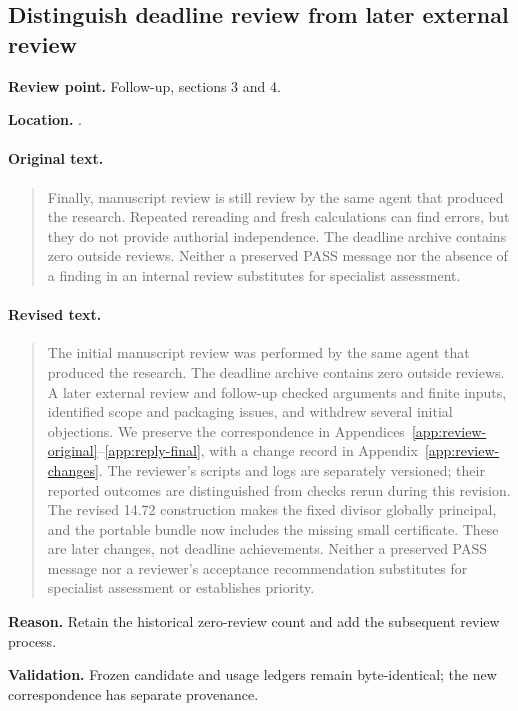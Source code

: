 \subsection{Distinguish deadline review from later external review}
\noindent\textbf{Review point.} Follow-up, sections 3 and 4.\par
\noindent\textbf{Location.} .

\paragraph{Original text.}
\begin{quote}\small
Finally, manuscript review is still review by the same agent that
produced the research. Repeated rereading and fresh calculations can
find errors, but they do not provide authorial independence. The
deadline archive contains zero outside reviews. Neither a preserved
PASS message nor the absence of a finding in an internal review
substitutes for specialist assessment.
\end{quote}

\paragraph{Revised text.}
\begin{quote}\small
The initial manuscript review was performed by the same agent that
produced the research. The deadline archive contains zero outside
reviews. A later external review and follow-up checked arguments and
finite inputs, identified scope and packaging issues, and withdrew
several initial objections. We preserve the correspondence in
Appendices~\ref{app:review-original}--\ref{app:reply-final}, with a
change record in Appendix~\ref{app:review-changes}. The reviewer's
scripts and logs are separately versioned; their reported outcomes
are distinguished from checks rerun during this revision.
The revised 14.72 construction makes the fixed divisor globally
principal, and the portable bundle now includes the missing small
certificate. These are later changes, not deadline achievements.
Neither a preserved PASS message nor a reviewer's acceptance
recommendation substitutes for specialist assessment or establishes
priority.
\end{quote}

\noindent\textbf{Reason.} Retain the historical zero-review count and add the subsequent review process.

\noindent\textbf{Validation.} Frozen candidate and usage ledgers remain byte-identical; the new correspondence has separate provenance.

